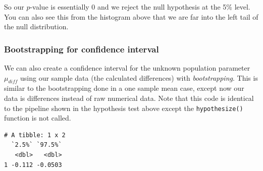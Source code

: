 \documentclass[12pt,]{krantz}
\makeatletter
\newenvironment{Shaded}{\begin{snugshade}}{\end{snugshade}}
\newcommand{\KeywordTok}[1]{\textcolor[rgb]{0.27,0.27,0.27}{\textbf{#1}}}
\newcommand{\DataTypeTok}[1]{\textcolor[rgb]{0.27,0.27,0.27}{#1}}
\newcommand{\DecValTok}[1]{\textcolor[rgb]{0.06,0.06,0.06}{#1}}
\newcommand{\StringTok}[1]{\textcolor[rgb]{0.5,0.5,0.5}{#1}}
\newcommand{\OperatorTok}[1]{\textcolor[rgb]{0.43,0.43,0.43}{\textbf{#1}}}
\newcommand{\NormalTok}[1]{#1}
\newenvironment{kframe}{%
\medskip{}
\setlength{\fboxsep}{.8em}
 \def\at@end@of@kframe{}%
 \ifinner\ifhmode%
  \def\at@end@of@kframe{\end{minipage}}%
  \begin{minipage}{\columnwidth}%
 \fi\fi%
 \def\FrameCommand##1{\hskip\@totalleftmargin \hskip-\fboxsep
 \colorbox{shadecolor}{##1}\hskip-\fboxsep
     \hskip-\linewidth \hskip-\@totalleftmargin \hskip\columnwidth}%
 \MakeFramed {\advance\hsize-\width
   \@totalleftmargin\z@ \linewidth\hsize
   \@setminipage}}%
 {\par\unskip\endMakeFramed%
 \at@end@of@kframe}
\renewenvironment{Shaded}{\begin{kframe}}{\end{kframe}}
\makeatother
\begin{document}
So our \(p\)-value is essentially 0 and we reject the null hypothesis at
the 5\% level. You can also see this from the histogram above that we
are far into the left tail of the null distribution.

\subsubsection*{Bootstrapping for confidence
interval}\label{bootstrapping-for-confidence-interval-4}

We can also create a confidence interval for the unknown population
parameter \(\mu_{diff}\) using our sample data (the calculated
differences) with \emph{bootstrapping}. This is similar to the
bootstrapping done in a one sample mean case, except now our data is
differences instead of raw numerical data. Note that this code is
identical to the pipeline shown in the hypothesis test above except the
\texttt{hypothesize()} function is not called.

\begin{Shaded}
\end{Shaded}

\begin{Shaded}
\end{Shaded}

\begin{verbatim}
# A tibble: 1 x 2
  `2.5%` `97.5%`
   <dbl>   <dbl>
1 -0.112 -0.0503
\end{verbatim}

\begin{Shaded}
\end{Shaded}
\end{document}
